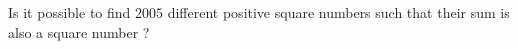 Is it possible to find $2005$ different positive square numbers such that their sum is also a square number ?
